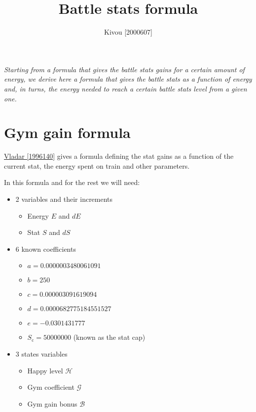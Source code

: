 \documentclass[12pt]{article}
\title{Battle stats formula}
\author{Kivou [2000607]}
\def\happy{\mathcal{H}}
\def\gym{\mathcal{G}}
\def\bonus{\mathcal{B}}
\def\Sc{S_\text{c}}
\begin{document}
\maketitle
\par{\it Starting from a formula that gives the battle stats gains for a certain amount of energy, we derive here  a formula that gives the battle stats as a function of energy and, in turns, the energy needed to reach a certain battle stats level from a given one.}

\section{Gym gain formula}
\href{https://www.torn.com/forums.php?p=threads&f=61&t=16003284&b=0&a=0&start=0&to=17684755}{Vladar [1996140]} gives a formula defining the stat gains as a function of the current stat, the energy spent on train and other parameters.

\par In this formula and for the rest we will need:
\begin{itemize}
    \item 2 variables and their increments
    \begin{itemize}
        \item Energy $E$ and $dE$
        \item Stat $S$ and $dS$
    \end{itemize}
    \item 6 known coefficients
        \begin{itemize}
            \item $a = 0.0000003480061091$
            \item $b = 250$
            \item $c = 0.000003091619094$
            \item $d = 0.0000682775184551527$
            \item $e = -0.0301431777$
            \item $\Sc = 50000000$ (known as the stat cap)
        \end{itemize}
    \item 3 states variables
    \begin{itemize}
        \item Happy level $\happy$
        \item Gym coefficient $\gym$
        \item Gym gain bonus $\bonus$
    \end{itemize}
\end{itemize}
\end{document}
